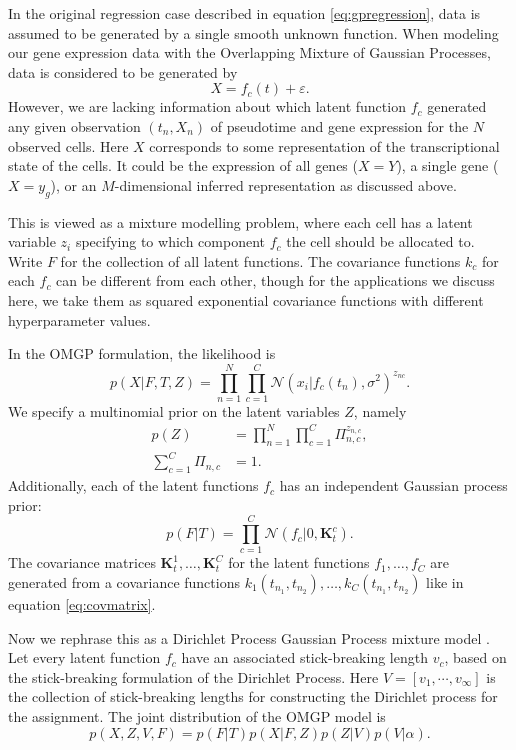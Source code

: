 In the original regression case described in equation \ref{eq:gpregression}, data is assumed to be generated by a single smooth unknown function. When modeling our gene expression data with the Overlapping Mixture of Gaussian Processes, data is considered to be generated by
\[ X = f_c(t) + \varepsilon. \]
However, we are lacking information about which latent function $ f_c $ generated any given observation $ ( t_n, X_n ) $ of pseudotime and gene expression for the $ N $ observed cells. Here $ X $ corresponds to some representation of the transcriptional state of the cells. It could be the expression of all genes ($ X = Y $), a single gene ($ X = y_g $), or an $ M $-dimensional inferred representation as discussed above.

This is viewed as a mixture modelling problem, where each cell has a latent variable $ z_i $ specifying to which component $ f_c $ the cell should be allocated to. Write $ F $ for the collection of all latent functions. The covariance functions $ k_c $ for each $ f_c $ can be different from each other, though for the applications we discuss here, we take them as squared exponential covariance functions with different hyperparameter values.

In the OMGP formulation, the likelihood is
\[
p(X | F, T, Z) = \prod_{n=1}^N \prod_{c=1}^C \mathcal{N}(x_i | f_c(t_n), \sigma^2)^{z_{nc}}.
\]
We specify a multinomial prior on the latent variables $ Z $, namely
\begin{align*}
p(Z) &= \prod_{n = 1}^N \prod_{c = 1}^C \Pi_{n, c}^{z_{n, c}}, \\
\sum_{c = 1}^C \Pi_{n,c} &= 1.
\end{align*}
Additionally, each of the latent functions $ f_c $ has an independent Gaussian process prior:
\[ p(F | T) = \prod_{c=1}^C \mathcal{N}( f_c | 0, \bm{K}^c_t). \]
The covariance matrices $ \bm{K}^1_t, \ldots, \bm{K}^C_t $ for the latent functions $ f_1, \ldots, f_C $ are generated from a covariance functions $ k_1(t_{n_1}, t_{n_2}), \ldots, k_C(t_{n_1}, t_{n_2}) $ like in equation \ref{eq:covmatrix}.

Now we rephrase this as a Dirichlet Process Gaussian Process mixture model \cite{Hensman2012-kr}. Let every latent function $ f_c $ have an associated stick-breaking length $ v_c $, based on the stick-breaking formulation of the Dirichlet Process. Here $ V = [v_1, \cdots, v_\infty] $ is the collection of stick-breaking lengths for constructing the Dirichlet process for the assignment. The joint distribution of the OMGP model is
\[
p(X, Z, V, F) = p(F | T) p(X | F, Z) p(Z | V ) p(V | \alpha).
\]

